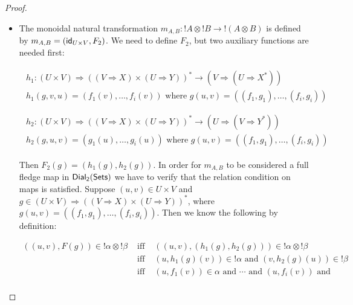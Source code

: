 \begin{proof}
\begin{center}
\begin{itemize}
    \item The monoidal natural transformation
      $m_{A,B} : !A \otimes !B \to !(A \otimes B)$ is defined by
      $m_{A,B} = (\mathsf{id}_{U \times V},F_2)$. We need to define $F_2$,
      but two auxiliary functions are needed first:
      \begin{center}
        \begin{math}
          \begin{array}{lll}
            \begin{array}{lll}
              h_1 : (U \times V) \Rightarrow ((V \Rightarrow X) \times (U \Rightarrow Y))^* \to 
                    (V \Rightarrow (U \Rightarrow X^*))\\
              h_1(g,v,u) = (f_1(v),\ldots,f_i(v))
              \text{ where } g(u,v) = ((f_1,g_1),\ldots,(f_i,g_i))
            \end{array}
            \\
            &  \\
            \begin{array}{lll}
              h_2 : (U \times V) \Rightarrow ((V \Rightarrow X) \times (U \Rightarrow Y))^* \to 
                    (U \Rightarrow (V \Rightarrow Y^*))\\
              h_2(g,u,v) = (g_1(u),\ldots,g_i(u))
              \text{ where } g(u,v) = ((f_1,g_1),\ldots,(f_i,g_i))
            \end{array}
          \end{array}
        \end{math}
      \end{center}
      Then $F_2(g) = (h_1(g),h_2(g))$.  In order for $m_{A,B}$ to be
      considered a full fledge map in $\mathsf{Dial_2}(\mathsf{Sets})$ we have to verify that
      the relation condition on maps is satisfied.  Suppose $(u,v) \in U \times V$ and 
      $g \in (U \times V) \Rightarrow ((V \Rightarrow X) \times (U \Rightarrow Y))^*$, 
      where $g(u,v) = ((f_1,g_1), \ldots,(f_i,g_i))$. Then we know the following by definition:
      \begin{center}
        \begin{math}
          \begin{array}{lll}
            ((u,v),F(g)) \in !\alpha \otimes !\beta 
            & \text{ iff } & ((u,v),(h_1(g),h_2(g))) \in !\alpha \otimes !\beta\\
            & \text{ iff } & (u,h_1(g)(v)) \in !\alpha \text{ and } (v,h_2(g)(u)) \in !\beta\\
            & \text{ iff } & (u,f_1(v)) \in \alpha \text{ and } \cdots \text{ and } (u,f_i(v)) \text{ and }\\

\end{array}
\end{math}
\end{center}
\end{itemize}
\end{center}
\end{proof}
